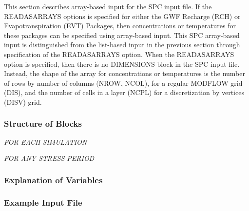 This section describes array-based input for the SPC input file.  If the READASARRAYS options is specified for either the GWF Recharge (RCH) or Evapotranspiration (EVT) Packages, then concentrations or temperatures for these packages can be specified using array-based input.  This SPC array-based input is distinguished from the list-based input in the previous section through specification of the READASARRAYS option.  When the READASARRAYS option is specified, then there is no DIMENSIONS block in the SPC input file.  Instead, the shape of the array for concentrations or temperatures is the number of rows by number of columns (NROW, NCOL), for a regular MODFLOW grid (DIS), and the number of cells in a layer (NCPL) for a discretization by vertices (DISV) grid.

\vspace{5mm}
\subsubsection{Structure of Blocks}
\vspace{5mm}

\noindent \textit{FOR EACH SIMULATION}

\vspace{5mm}
\noindent \textit{FOR ANY STRESS PERIOD}


\vspace{5mm}
\subsubsection{Explanation of Variables}
\begin{description}

\end{description}

\subsubsection{Example Input File}
